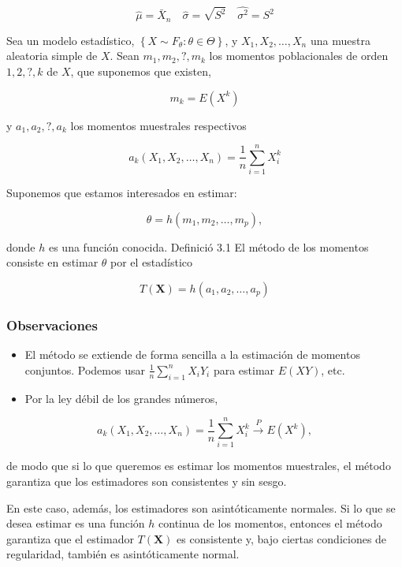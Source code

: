 \documentclass[
]{article}
\providecommand{\tightlist}{%
  \setlength{\itemsep}{0pt}\setlength{\parskip}{0pt}}
\begin{document}
\[
\widehat{\mu}=\bar{X}_{n} \quad \widehat{\sigma}=\sqrt{S^{2}} \quad \widehat{\sigma^{2}}=S^{2}
\]

Sea un modelo estadístico, \(\left\{X \sim F_{\theta}: \theta \in \Theta\right\}\), y \(X_{1}, X_{2}, \ldots, X_{n}\) una muestra aleatoria simple de \(X\). Sean \(m_{1}, m_{2}, ?, m_{k}\) los momentos poblacionales de orden \(1,2, ?, k\) de \(X\), que suponemos que existen,

\[
m_{k}=E\left(X^{k}\right)
\]

y \(a_{1}, a_{2}, ?, a_{k}\) los momentos muestrales respectivos

\[
a_{k}\left(X_{1}, X_{2}, \ldots, X_{n}\right)=\frac{1}{n} \sum_{i=1}^{n} X_{i}^{k}
\]

Suponemos que estamos interesados en estimar:

\[
\theta=h\left(m_{1}, m_{2}, \ldots, m_{p}\right),
\]

donde \(h\) es una función conocida.
Definició 3.1 El método de los momentos consiste en estimar \(\theta\) por el estadístico

\[
T(\mathbf{X})=h\left(a_{1}, a_{2}, \ldots, a_{p}\right)
\]

\subsubsection{Observaciones}\label{observaciones}

\begin{itemize}
\tightlist
\item
  El método se extiende de forma sencilla a la estimación de momentos conjuntos. Podemos usar \(\frac{1}{n} \sum_{i=1}^{n} X_{i} Y_{i}\) para estimar \(E(X Y)\), etc.
\item
  Por la ley débil de los grandes números,
\end{itemize}

\[
a_{k}\left(X_{1}, X_{2}, \ldots, X_{n}\right)=\frac{1}{n} \sum_{i=1}^{n} X_{i}^{k} \xrightarrow{P} E\left(X^{k}\right),
\]

de modo que si lo que queremos es estimar los momentos muestrales, el método garantiza que los estimadores son consistentes y sin sesgo.

En este caso, además, los estimadores son asintóticamente normales. Si lo que se desea estimar es una función \(h\) continua de los momentos, entonces el método garantiza que el estimador \(T(\mathbf{X})\) es consistente y, bajo ciertas condiciones de regularidad, también es asintóticamente normal.
\end{document}

